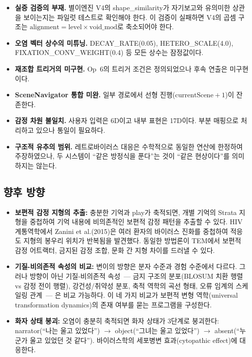 \documentclass[11pt, a4paper]{article}
\begin{document}
\begin{itemize}
    \item \textbf{실증 검증의 부재.} 별이엔진 V4의 shape\_similarity가 자기보고와 유의미한 상관을 보이는지는 파일럿 테스트로 확인해야 한다. 이 검증이 실패하면 V4의 곱셈 구조는 $\text{alignment} = \text{level} \times \text{void\_mod}$로 축소되어야 한다.
    \item \textbf{오염 벡터 상수의 미튜닝.} DECAY\_RATE(0.05), HETERO\_SCALE(4.0), FIXATION\_CONV\_WEIGHT(0.4) 등 모든 상수는 잠정값이다.
    \item \textbf{재조합 트리거의 미구현.} Op~6의 트리거 조건은 정의되었으나 후속 연출은 미구현이다.
    \item \textbf{SceneNavigator 통합 미완.} 일부 경로에서 선형 진행($\text{currentScene} + 1$)이 잔존한다.
    \item \textbf{감정 차원 불일치.} 사용자 입력은 6D이고 내부 표현은 17D이다. 부분 매핑으로 처리하고 있으나 통일이 필요하다.
    \item \textbf{구조적 유추의 범위.} 레트로바이러스 대응은 수학적으로 동일한 연산에 한정하여 주장하였으나, 두 시스템이 ``같은 방정식을 푼다''는 것이 ``같은 현상이다''를 의미하지는 않는다\cite{gentner1983}.
\end{itemize}

\subsection{향후 방향}

\begin{itemize}
    \item \textbf{보편적 감정 지형의 추출:} 충분한 기억과 play가 축적되면, 개별 기억의 Strata 지형을 중첩하여 기억 내용에 비의존적인 보편적 감정 패턴을 추출할 수 있다. HIV 계통역학에서 Zanini et al.(2015)은 여러 환자의 바이러스 진화를 중첩하여 적응도 지형의 봉우리 위치가 반복됨을 발견했다\cite{zanini2015}. 동일한 방법론이 TEM에서 보편적 감정 어트랙터, 금지된 감정 조합, 문화 간 지형 차이를 드러낼 수 있다.
    \item \textbf{기질-비의존적 속성의 비교:} 변이의 방향은 분자 수준과 경험 수준에서 다르다. 그러나 방향이 아닌 기질-비의존적 속성~--- 금지 구조의 분포(BLOSUM 치환 행렬\cite{henikoff1992} vs 감정 전이 행렬), 강건성/취약성 분포, 축적 역학의 곡선 형태\cite{rambaut2004}, 오류 임계의 스케일링 관계~--- 은 비교 가능하다. 이 네 가지 비교가 보편적 변형 역학(universal transformation dynamics)의 존재 여부를 묻는 프로그램을 구성한다.
    \item \textbf{화자 상태 붕괴:} 오염이 충분히 축적되면 화자 상태가 3단계로 붕괴한다: narrator(``나는 울고 있었다'') $\to$ object(``그녀는 울고 있었다'') $\to$ absent(``누군가 울고 있었던 것 같다''). 바이러스학의 세포병변 효과(cytopathic effect)에 대응한다.
\end{itemize}



\end{document}
